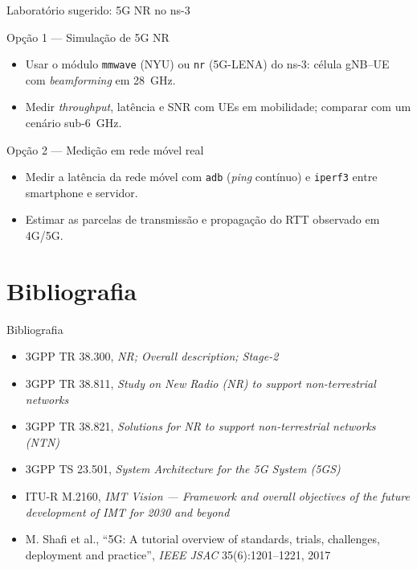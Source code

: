 \documentclass[aspectratio=169,11pt]{beamer}
\begin{document}
\begin{frame}{Laboratório sugerido: 5G NR no ns-3}
  \begin{block}{Opção 1 --- Simulação de 5G NR}
    \begin{itemize}
      \item Usar o módulo \texttt{mmwave} (NYU) ou \texttt{nr} (5G-LENA) do ns-3: célula gNB--UE com \emph{beamforming} em 28~GHz.
      \item Medir \emph{throughput}, latência e SNR com UEs em mobilidade; comparar com um cenário sub-6~GHz.
    \end{itemize}
  \end{block}
  \begin{block}{Opção 2 --- Medição em rede móvel real}
    \begin{itemize}
      \item Medir a latência da rede móvel com \texttt{adb} (\emph{ping} contínuo) e \texttt{iperf3} entre smartphone e servidor.
      \item Estimar as parcelas de transmissão e propagação do RTT observado em 4G/5G.
    \end{itemize}
  \end{block}
\end{frame}

\section{Bibliografia}

\begin{frame}{Bibliografia}
  \begin{itemize}
    \item 3GPP TR 38.300, \emph{NR; Overall description; Stage-2}
    \item 3GPP TR 38.811, \emph{Study on New Radio (NR) to support non-terrestrial networks}
    \item 3GPP TR 38.821, \emph{Solutions for NR to support non-terrestrial networks (NTN)}
    \item 3GPP TS 23.501, \emph{System Architecture for the 5G System (5GS)}
    \item ITU-R M.2160, \emph{IMT Vision --- Framework and overall objectives of the future development of IMT for 2030 and beyond}
    \item M. Shafi et al., ``5G: A tutorial overview of standards, trials, challenges, deployment and practice'', \emph{IEEE JSAC} 35(6):1201--1221, 2017
  \end{itemize}
\end{frame}
\end{document}
